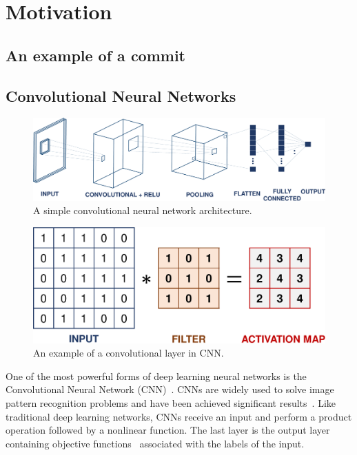 
\section{Motivation}
\label{sec:motivation}



\subsection{An example of a commit }
\label{sec:examle}

\subsection{Convolutional Neural Networks}
\label{sec:background_cnn}

\begin{figure}[t!]
	\center
	\includegraphics[scale=0.3]{figs/cnn.pdf}
	\caption{A simple convolutional neural network architecture.}
	\label{fig:cnn}
\end{figure}

\begin{figure}[t!]
	\center
	\includegraphics[scale=0.27]{figs/filter.pdf}
	\caption{An example of a convolutional layer in CNN.}
	\label{fig:filter}
\end{figure}

One of the most powerful forms of deep learning neural networks is the Convolutional Neural Network (CNN)~\cite{lecun2015deep}. CNNs are widely used to solve image pattern recognition problems and have been achieved significant results~\cite{karpathy2014large, lawrence1997face, krizhevsky2012imagenet}. Like traditional deep learning networks, CNNs receive an input and perform a product operation followed by a nonlinear function. The last layer is the output layer containing objective functions~\cite{zhao2017loss} associated with the labels of the input.

